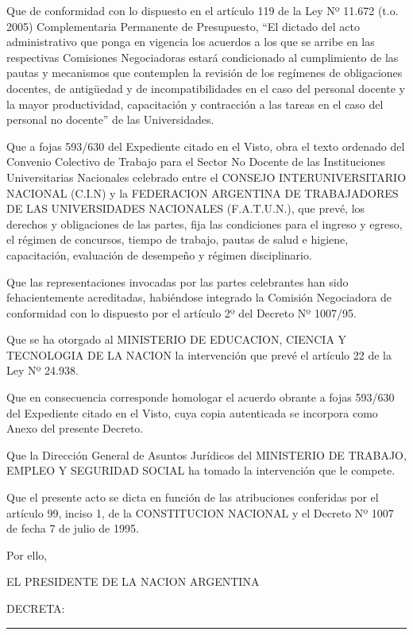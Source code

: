 \documentclass[]{article}
\begin{document}
Que de conformidad con lo dispuesto en el artículo 119 de la Ley Nº
11.672 (t.o. 2005) Complementaria Permanente de Presupuesto, ``El
dictado del acto administrativo que ponga en vigencia los acuerdos a los
que se arribe en las respectivas Comisiones Negociadoras estará
condicionado al cumplimiento de las pautas y mecanismos que contemplen
la revisión de los regímenes de obligaciones docentes, de antigüedad y
de incompatibilidades en el caso del personal docente y la mayor
productividad, capacitación y contracción a las tareas en el caso del
personal no docente'' de las Universidades.

Que a fojas 593/630 del Expediente citado en el Visto, obra el texto
ordenado del Convenio Colectivo de Trabajo para el Sector No Docente de
las Instituciones Universitarias Nacionales celebrado entre el CONSEJO
INTERUNIVERSITARIO NACIONAL (C.I.N) y la FEDERACION ARGENTINA DE
TRABAJADORES DE LAS UNIVERSIDADES NACIONALES (F.A.T.U.N.), que prevé,
los derechos y obligaciones de las partes, fija las condiciones para el
ingreso y egreso, el régimen de concursos, tiempo de trabajo, pautas de
salud e higiene, capacitación, evaluación de desempeño y régimen
disciplinario.

Que las representaciones invocadas por las partes celebrantes han sido
fehacientemente acreditadas, habiéndose integrado la Comisión
Negociadora de conformidad con lo dispuesto por el artículo 2º del
Decreto Nº 1007/95.

Que se ha otorgado al MINISTERIO DE EDUCACION, CIENCIA Y TECNOLOGIA DE
LA NACION la intervención que prevé el artículo 22 de la Ley Nº 24.938.

Que en consecuencia corresponde homologar el acuerdo obrante a fojas
593/630 del Expediente citado en el Visto, cuya copia autenticada se
incorpora como Anexo del presente Decreto.

Que la Dirección General de Asuntos Jurídicos del MINISTERIO DE TRABAJO,
EMPLEO Y SEGURIDAD SOCIAL ha tomado la intervención que le compete.

Que el presente acto se dicta en función de las atribuciones conferidas
por el artículo 99, inciso 1, de la CONSTITUCION NACIONAL y el Decreto
Nº 1007 de fecha 7 de julio de 1995.

Por ello,

EL PRESIDENTE DE LA NACION ARGENTINA

DECRETA:

\begin{center}\rule{0.5\linewidth}{\linethickness}\end{center}
\end{document}
